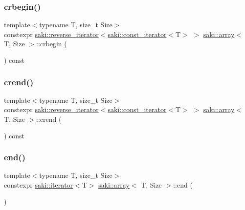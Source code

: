 \mbox{\label{classsaki_1_1array_a16bc4c34eaa4c1f1e526636f0e37da27}} 
\subsubsection{\texorpdfstring{crbegin()}{crbegin()}}
{\footnotesize\ttfamily template$<$typename T, size\+\_\+t Size$>$ \\
constexpr \mbox{\hyperlink{classsaki_1_1reverse__iterator}{saki\+::reverse\+\_\+iterator}}$<$\mbox{\hyperlink{classsaki_1_1const__iterator}{saki\+::const\+\_\+iterator}}$<$T$>$ $>$ \mbox{\hyperlink{classsaki_1_1array}{saki\+::array}}$<$ T, Size $>$\+::crbegin (\begin{DoxyParamCaption}{ }\end{DoxyParamCaption}) const\hspace{0.3cm}{\ttfamily [inline]}}

\mbox{\label{classsaki_1_1array_ad56a6f2dbbf83c04c97108b11402d50d}} 
\subsubsection{\texorpdfstring{crend()}{crend()}}
{\footnotesize\ttfamily template$<$typename T, size\+\_\+t Size$>$ \\
constexpr \mbox{\hyperlink{classsaki_1_1reverse__iterator}{saki\+::reverse\+\_\+iterator}}$<$\mbox{\hyperlink{classsaki_1_1const__iterator}{saki\+::const\+\_\+iterator}}$<$T$>$ $>$ \mbox{\hyperlink{classsaki_1_1array}{saki\+::array}}$<$ T, Size $>$\+::crend (\begin{DoxyParamCaption}{ }\end{DoxyParamCaption}) const\hspace{0.3cm}{\ttfamily [inline]}}

\mbox{\label{classsaki_1_1array_ab8fcbb4d2c4fe5dae1b78a7486873402}} 
\subsubsection{\texorpdfstring{end()}{end()}\hspace{0.1cm}{\footnotesize\ttfamily [1/2]}}
{\footnotesize\ttfamily template$<$typename T, size\+\_\+t Size$>$ \\
constexpr \mbox{\hyperlink{classsaki_1_1iterator}{saki\+::iterator}}$<$T$>$ \mbox{\hyperlink{classsaki_1_1array}{saki\+::array}}$<$ T, Size $>$\+::end (\begin{DoxyParamCaption}{ }\end{DoxyParamCaption})\hspace{0.3cm}{\ttfamily [inline]}}


